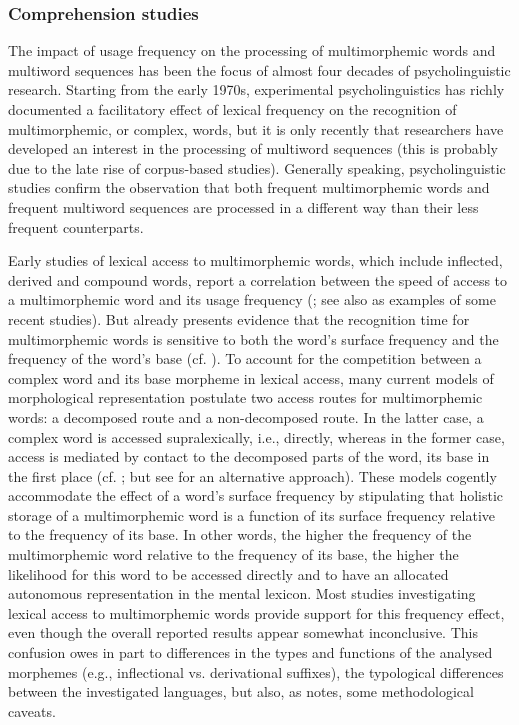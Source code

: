 \subsubsection{Comprehension studies}
The impact of usage frequency on the processing of multimorphemic words and multiword sequences has been the focus of almost four decades of psycholinguistic research. Starting from the early 1970s, experimental psycholinguistics has richly documented a facilitatory effect of lexical frequency on the recognition of multimorphemic, or complex, words, but it is only recently that researchers have developed an interest in the processing of multiword sequences (this is probably due to the late rise of corpus-based studies). Generally speaking, psycholinguistic studies confirm the observation that both frequent multimorphemic words and frequent multiword sequences are processed in a different way than their less frequent counterparts. 

Early studies of lexical access to multimorphemic words, which include inflected, derived and compound words, report a correlation between the speed of access to a multimorphemic word and its usage frequency (\citealt{morton-1969, taft-forster-1976, bradley-1979, stemberger-macwhinney-1986}; see also \citealt{giraudo-grainger, janssen-bi-caramazza} as examples of some recent studies). But already \citet{taft-1979} presents evidence that the recognition time for multimorphemic words is sensitive to both the word's surface frequency and the frequency of the word's base (cf. \citealt{burani-caramazza-1987,cole-etal-1989,alegre-gordon-1999,meunier-segui}). To account for the competition between a complex word and its base morpheme in lexical access, many current models of morphological representation postulate two access routes for multimorphemic words: a decomposed route and a non-decomposed route. In the latter case, a complex word is accessed supralexically, i.e., directly, whereas in the former case, access is mediated by contact to the decomposed parts of the word, its base in the first place (cf. \citealt{caramazza-etal-1988,baayen-1992,frauenfelder-schreuder-1992,baayen-schreuder-1999,hay-2001,blumenthal}; but see \citealt{bien-baayen-levelt} for an alternative approach). These models cogently accommodate the effect of a word's surface frequency by stipulating that holistic storage of a multimorphemic word is a function of its surface frequency relative to the frequency of its base. In other words, the higher the frequency of the multimorphemic word relative to the frequency of its base, the higher the likelihood for this word to be accessed directly and to have an allocated autonomous representation in the mental lexicon. Most studies investigating lexical access to multimorphemic words provide support for this frequency effect, even though the overall reported results appear somewhat inconclusive. This confusion owes in part to differences in the types and functions of the analysed morphemes (e.g., inflectional vs. derivational suffixes), the typological differences between the investigated languages, but also, as \citet[][1063--1066]{hay-2001} notes, some methodological caveats. 

